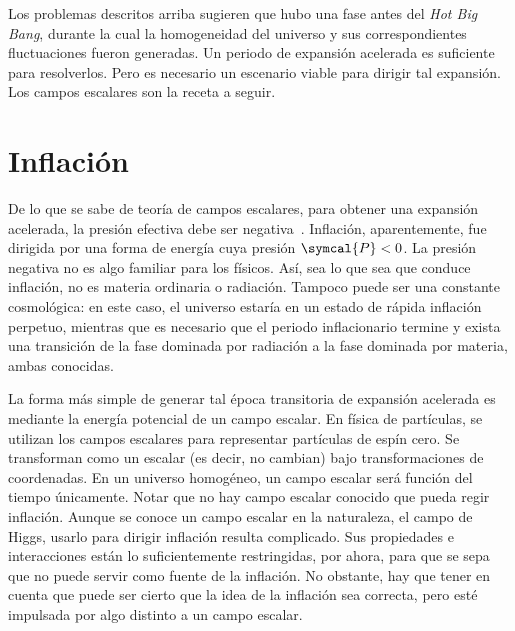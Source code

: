 Los problemas descritos arriba sugieren que hubo una fase antes del \textit{Hot Big Bang}, durante la cual la homogeneidad del universo y sus correspondientes fluctuaciones fueron generadas. Un periodo de expansión acelerada es suficiente para resolverlos. Pero es necesario un escenario viable para dirigir tal expansión. Los campos escalares son la receta a seguir.
\section{Inflación}
De lo que se sabe de teoría de campos escalares, para obtener una expansión acelerada, la presión efectiva debe ser negativa~\cite{dodelson2020modern}. Inflación, aparentemente, fue dirigida por una forma de energía cuya presión \(\symcal{P}<0\). La presión negativa no es algo familiar para los físicos. Así, sea lo que sea que conduce inflación, no es materia ordinaria o radiación. Tampoco puede ser una constante cosmológica: en este caso, el universo estaría en un estado de rápida inflación perpetuo, mientras que es necesario que el periodo inflacionario termine y exista una transición de la fase dominada por radiación a la fase dominada por materia, ambas conocidas.

La forma más simple de generar tal época transitoria de expansión acelerada es mediante la energía potencial de un campo escalar. En física de partículas, se utilizan los campos escalares para representar partículas de espín cero. Se transforman como un escalar (es decir, no cambian) bajo transformaciones de coordenadas. En un universo homogéneo, un campo escalar será función del tiempo únicamente. Notar que no hay campo escalar conocido que pueda regir inflación. Aunque se conoce un campo escalar en la naturaleza, el campo de Higgs, usarlo para dirigir inflación resulta complicado. Sus propiedades e interacciones están lo suficientemente restringidas, por ahora, para que se sepa que no puede servir como fuente de la inflación. No obstante, hay que tener en cuenta que puede ser cierto que la idea de la inflación sea correcta, pero esté impulsada por algo distinto a un campo escalar.

